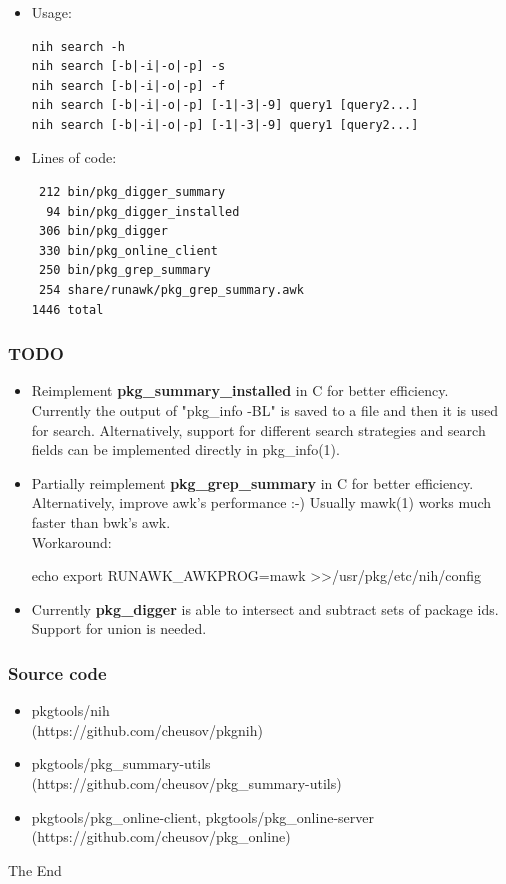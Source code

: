 \documentclass[hyperref=unicode,ascii,xcolor=dvipsnames]{beamer}
\begin{document}
\begin{frame}[fragile]
  \frametitle{}
  \begin{itemize}
  \item Usage:
\begin{verbatim}
nih search -h
nih search [-b|-i|-o|-p] -s
nih search [-b|-i|-o|-p] -f
nih search [-b|-i|-o|-p] [-1|-3|-9] query1 [query2...]
nih search [-b|-i|-o|-p] [-1|-3|-9] query1 [query2...]
\end{verbatim}
\item Lines of code:
\begin{verbatim}
 212 bin/pkg_digger_summary
  94 bin/pkg_digger_installed
 306 bin/pkg_digger
 330 bin/pkg_online_client
 250 bin/pkg_grep_summary
 254 share/runawk/pkg_grep_summary.awk
1446 total
\end{verbatim}
  \end{itemize}
\end{frame}

\begin{frame}[fragile]
  \frametitle{TODO}
  \begin{itemize}
  \item Reimplement {\bf pkg\_summary\_installed} in C for better efficiency.
Currently the output of "pkg\_info -BL" is saved to a file and then it is used for search.
Alternatively, support for different search strategies and search fields
can be implemented directly in pkg\_info(1).
  \item Partially reimplement {\bf pkg\_grep\_summary} in C for better efficiency.
Alternatively, improve awk's performance :-) Usually mawk(1) works much faster
than bwk's awk.\\
{\footnotesize Workaround:}\\
\begin{CodeNoLabelSmallest}
echo export RUNAWK\_AWKPROG=mawk \textgreater\textgreater /usr/pkg/etc/nih/config
\end{CodeNoLabelSmallest}
  \item Currently {\bf pkg\_digger} is able to intersect and subtract sets of package ids.
    Support for union is needed.
  \end{itemize}
\end{frame}

\begin{frame}[fragile]
  \frametitle{Source code}
  \begin{itemize}
  \item pkgtools/nih\\
    (https://github.com/cheusov/pkgnih)
  \item pkgtools/pkg\_summary-utils\\
    (https://github.com/cheusov/pkg\_summary-utils)
  \item pkgtools/pkg\_online-client, pkgtools/pkg\_online-server\\
    (https://github.com/cheusov/pkg\_online)
  \end{itemize}
  \begin{center}
    \Huge{The End}
  \end{center}
\end{frame}

\end{document}
